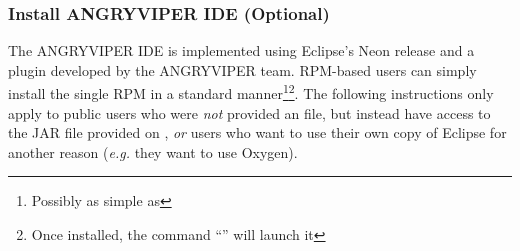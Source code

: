 \subsubsection{Install ANGRYVIPER IDE (Optional)}
\label{subsec:installing_ide_github}
The ANGRYVIPER IDE is implemented using Eclipse's Neon release and a plugin developed by the ANGRYVIPER team.
RPM-based users can simply install the single RPM in a standard manner\footnote{Possibly as simple as }\footnote{Once installed, the command ``'' will launch it}.
The following instructions only apply to public users who were \textit{not} provided an  file, but instead have access to the JAR file provided on , \textit{or} users who want to use their own copy of Eclipse for another reason (\textit{e.g.} they want to use Oxygen).

